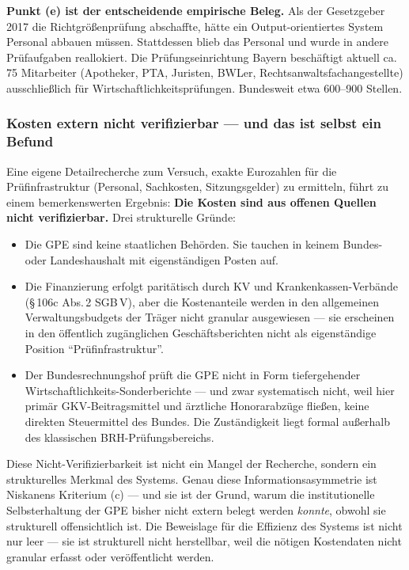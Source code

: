 \documentclass{umbruch-position}
\begin{document}
\textbf{Punkt (e) ist der entscheidende empirische Beleg.} Als der Gesetzgeber 2017 die Richtgrößenprüfung abschaffte, hätte ein Output-orientiertes System Personal abbauen müssen. Stattdessen blieb das Personal und wurde in andere Prüfaufgaben reallokiert. Die Prüfungseinrichtung Bayern beschäftigt aktuell ca. 75 Mitarbeiter (Apotheker, PTA, Juristen, BWLer, Rechtsanwaltsfachangestellte) ausschließlich für Wirtschaftlichkeitsprüfungen. Bundesweit etwa 600--900 Stellen.

\subsubsection{Kosten extern nicht verifizierbar — und das ist selbst ein Befund}

Eine eigene Detailrecherche zum Versuch, exakte Eurozahlen für die Prüfinfrastruktur (Personal, Sachkosten, Sitzungsgelder) zu ermitteln, führt zu einem bemerkenswerten Ergebnis: \textbf{Die Kosten sind aus offenen Quellen nicht verifizierbar.} Drei strukturelle Gründe:

\begin{itemize}[nosep]
  \item Die GPE sind keine staatlichen Behörden. Sie tauchen in keinem Bundes- oder Landeshaushalt mit eigenständigen Posten auf.
  \item Die Finanzierung erfolgt paritätisch durch KV und Krankenkassen-Verbände (\S\,106c Abs.\,2 SGB\,V), aber die Kostenanteile werden in den allgemeinen Verwaltungsbudgets der Träger nicht granular ausgewiesen --- sie erscheinen in den öffentlich zugänglichen Geschäftsberichten nicht als eigenständige Position ``Prüfinfrastruktur''.
  \item Der Bundesrechnungshof prüft die GPE nicht in Form tiefergehender Wirtschaftlichkeits-Sonderberichte — und zwar systematisch nicht, weil hier primär GKV-Beitragsmittel und ärztliche Honorarabzüge fließen, keine direkten Steuermittel des Bundes. Die Zuständigkeit liegt formal außerhalb des klassischen BRH-Prüfungsbereichs.
\end{itemize}

Diese Nicht-Verifizierbarkeit ist nicht ein Mangel der Recherche, sondern ein strukturelles Merkmal des Systems. Genau diese Informationsasymmetrie ist Niskanens Kriterium (c) — und sie ist der Grund, warum die institutionelle Selbsterhaltung der GPE bisher nicht extern belegt werden \textit{konnte}, obwohl sie strukturell offensichtlich ist. Die Beweislage für die Effizienz des Systems ist nicht nur leer --- sie ist strukturell nicht herstellbar, weil die nötigen Kostendaten nicht granular erfasst oder veröffentlicht werden.
\end{document}
